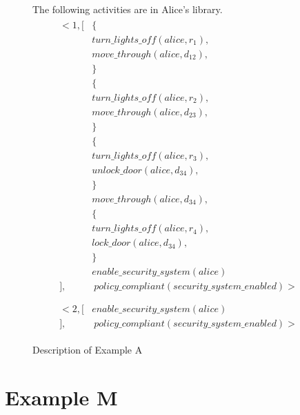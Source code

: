 \begin{figure}[H]
\begin{framed}
        The following activities are in Alice's library.
        \begin{gather}
        \begin{split}
            <1, [
                & \{ \\
                    & turn\_lights\_off(alice, r_1), \\
                    & move\_through(alice, d_{12}), \\
                & \} \\
                & \{ \\
                    & turn\_lights\_off(alice, r_{2}), \\
                    & move\_through(alice, d_{23}), \\
                & \} \\
                & \{ \\
                    & turn\_lights\_off(alice, r_{3}), \\
                    & unlock\_door(alice, d_{34}), \\
                & \} \\
                & move\_through(alice, d_{34}), \\
                & \{ \\
                    & turn\_lights\_off(alice, r_{4}), \\
                    & lock\_door(alice, d_{34}), \\
                & \} \\
                & enable\_security\_system(alice) \\
            ], & \ policy\_compliant(security\_system\_enabled)> \\
        \end{split} \\
        \begin{split}
            <2, [
                & enable\_security\_system(alice) \\
            ], & \ policy\_compliant(security\_system\_enabled)>
        \end{split}
        \end{gather}
    \end{framed}
    \caption{Description of Example A}
    \label{fig:apia_example_l_description}
\end{figure}

\section{Example M}


